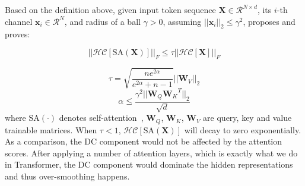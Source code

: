 \documentclass{article}
\theoremstyle{plain}
\theoremstyle{definition}
\theoremstyle{remark}
\begin{document}
Based on the definition above, given input token sequence $\mathbf{X}\in \mathcal{R}^{N \times d} $, its $i$-th channel $\mathbf{x}_i \in \mathcal{R}^N$, and radius of a ball $\gamma > 0$, assuming $||\mathbf{x}_i||_2 \le \gamma^2$, \citet{wang2022anti} proposes and proves:

\begin{equation}\label{eq: smoothing rate}
    ||\mathcal{HC}[\mathrm{SA}(\mathbf{X})]||_{F} \le \tau ||\mathcal{HC}[\mathbf{X}]||_{F}
\end{equation}

\begin{equation}\label{eq: tau define}
    \tau =  \sqrt{\frac{ne^{2\alpha}}{e^{2\alpha}+n-1}} ||\mathbf{W}_V||_2
\end{equation}
\begin{equation}\label{eq: alpha define}
    \alpha \le \frac{\gamma^2||\mathbf{W}_Q{\mathbf{W}_K}^T||_2}{\sqrt{d}}
\end{equation}
where $\mathrm{SA}(\cdot)$ denotes self-attention~\citep{vaswani2017attention}, $\mathbf{W}_Q$, $\mathbf{W}_K$, $\mathbf{W}_V$ are query, key and value trainable matrices. When $\tau < 1$, $\mathcal{HC}[\mathrm{SA}(\mathbf{X})]$ will decay to zero exponentially. As a comparison, the DC component would not be affected by the attention scores. After applying a number of attention layers, which is exactly what we do in Transformer, the DC component would dominate the hidden representations and thus over-smoothing happens.
\end{document}
